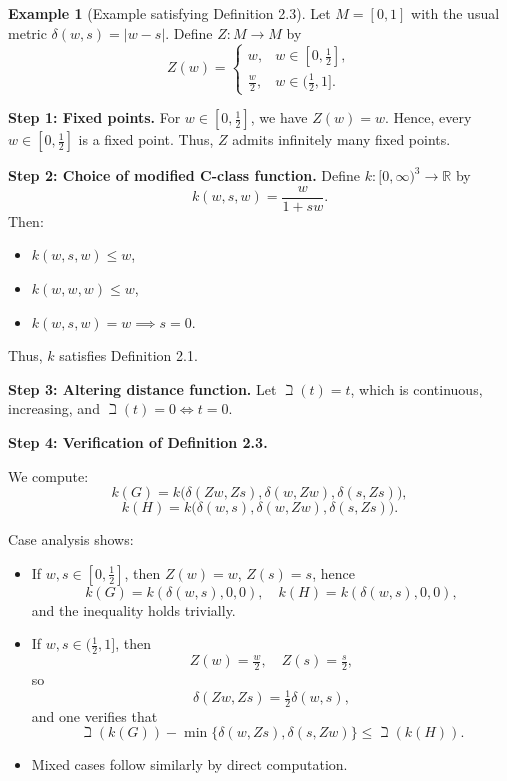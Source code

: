 \documentclass[11pt,reqno]{amsart}
\theoremstyle{definition}
\newtheorem{example}[theorem]{Example}
\theoremstyle{remark}
\numberwithin{equation}{section}
\begin{document}
	\begin{example}[Example satisfying Definition 2.3]
		Let $M = [0,1]$ with the usual metric $\delta(w,s)=|w-s|$. Define $Z:M \to M$ by
		\[
		Z(w) =
		\begin{cases}
			w, & w \in [0,\tfrac{1}{2}], \\
			\frac{w}{2}, & w \in (\tfrac{1}{2},1].
		\end{cases}
		\]
		
		\textbf{Step 1: Fixed points.}  
		For $w \in [0,\tfrac{1}{2}]$, we have $Z(w)=w$. Hence, every $w \in [0,\tfrac{1}{2}]$ is a fixed point. Thus, $Z$ admits infinitely many fixed points.
		
		\medskip
		
		\textbf{Step 2: Choice of modified C-class function.}  
		Define $k:[0,\infty)^3 \to \mathbb{R}$ by
		\[
		k(w,s,w) = \frac{w}{1+sw}.
		\]
		Then:
		\begin{itemize}
			\item $k(w,s,w) \leq w$,
			\item $k(w,w,w) \leq w$,
			\item $k(w,s,w)=w \implies s=0$.
		\end{itemize}
		Thus, $k$ satisfies Definition 2.1.
		
		\medskip
		
		\textbf{Step 3: Altering distance function.}  
		Let $\beth(t)=t$, which is continuous, increasing, and $\beth(t)=0 \iff t=0$.
		
		\medskip
		
		\textbf{Step 4: Verification of Definition 2.3.}  
		
		We compute:
		\[
		k(G)=k\big(\delta(Zw,Zs),\delta(w,Zw),\delta(s,Zs)\big),
		\]
		\[
		k(H)=k\big(\delta(w,s),\delta(w,Zw),\delta(s,Zs)\big).
		\]
		
		Case analysis shows:
		\begin{itemize}
			\item If $w,s \in [0,\tfrac{1}{2}]$, then $Z(w)=w$, $Z(s)=s$, hence
			\[
			k(G)=k(\delta(w,s),0,0), \quad k(H)=k(\delta(w,s),0,0),
			\]
			and the inequality holds trivially.
			
			\item If $w,s \in (\tfrac{1}{2},1]$, then
			\[
			Z(w)=\tfrac{w}{2}, \quad Z(s)=\tfrac{s}{2},
			\]
			so
			\[
			\delta(Zw,Zs)=\tfrac{1}{2}\delta(w,s),
			\]
			and one verifies that
			\[
			\beth(k(G)) - \min\{\delta(w,Zs),\delta(s,Zw)\}
			\leq \beth(k(H)).
			\]
			
			\item Mixed cases follow similarly by direct computation.
		\end{itemize}
	\end{example}
		\bigskip
		
\end{document}
